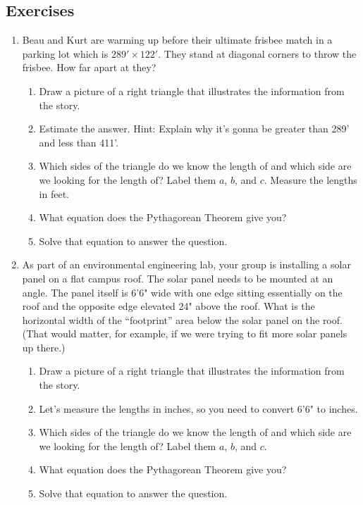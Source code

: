 \subsection*{Exercises}

\begin{enumerate} 

\item Beau and Kurt are warming up before their ultimate frisbee match in a parking lot which is $289' \times 122'$.  They stand at diagonal corners to throw the frisbee.  How far apart at they?
\begin{enumerate}
    \item Draw a picture of a right triangle that illustrates the information from the story.
    \item Estimate the answer.  Hint: Explain why it's gonna be greater than 289' and less than 411'.
    \item Which sides of the triangle do we know the length of and which side are we looking for the length of?  Label them $a$, $b$, and $c$.  Measure the lengths in feet.
    \item What equation does the Pythagorean Theorem give you?
    \item Solve that equation to answer the question. %
\end{enumerate}

\item As part of an environmental engineering lab, your group is installing a solar panel on a flat campus roof. The solar panel needs to be mounted at an angle. The panel itself is 6'6" wide with one edge sitting essentially on the roof and the opposite edge elevated 24" above the roof.  What is the horizontal width of the ``footprint'' area below the solar panel on the roof. (That would matter, for example, if we were trying to fit more solar panels up there.)

\begin{enumerate}
    \item Draw a picture of a right triangle that illustrates the information from the story.
    \item Let's measure the lengths in inches, so you need to convert 6'6" to inches.
    \item Which sides of the triangle do we know the length of and which side are we looking for the length of?  Label them $a$, $b$, and $c$.  
    \item What equation does the Pythagorean Theorem give you?
    \item Solve that equation to answer the question.
\end{enumerate}


\end{enumerate}

